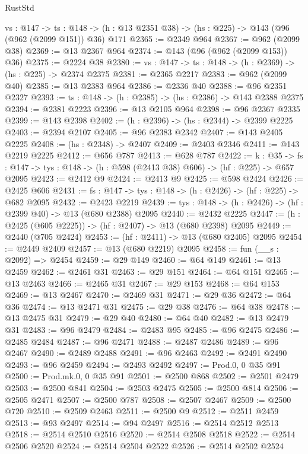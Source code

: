 \begin{lexlean}{RustStd}
\begin{coremodule}
{\begin{coremodule}
{{{{{  {vs : @147} ->
  {ts : @148} -> (h : @13 @2351 @38) -> (hs : @225) -> @143 (@96 (@962 (@2099 @151)) @36) @171
@2365 := @2349 @964
@2367 := @962 (@2099 @38)
@2369 := @13 @2367 @964
@2374 := @143 (@96 (@962 (@2099 @153)) @36)
@2375 := @2224 @38
@2380 := {vs : @147} -> {ts : @148} -> (h : @2369) -> (hs : @225) -> @2374 @2375
@2381 := @2365 @2217
@2383 := @962 (@2099 @40)
@2385 := @13 @2383 @964
@2386 := @2336 @40
@2388 := @96 @2351 @2327
@2393 := {ts : @148} -> (h : @2385) -> (hs : @2386) -> @143 @2388 @2375
@2394 := @2381 @2223
@2396 := @13 @2105 @964
@2398 := @96 @2367 @2335
@2399 := @143 @2398
@2402 := (h : @2396) -> (hs : @2344) -> @2399 @2225
@2403 := @2394 @2107
@2405 := @96 @2383 @2342
@2407 := @143 @2405 @2225
@2408 := (hs : @2348) -> @2407
@2409 := @2403 @2346
@2411 := @143 @2219 @2225
@2412 := @656 @787
@2413 := @628 @787
@2422 := {k : @35} ->
  {fs : @147} -> {tys : @148} -> (h : @598 (@2413 @38) @606) -> (hf : @225) -> @657 @2095
@2423 := @2412 @9
@2424 := @2413 @9
@2425 := @598 @2424
@2426 := @2425 @606
@2431 := {fs : @147} -> {tys : @148} -> (h : @2426) -> (hf : @225) -> @682 @2095
@2432 := @2423 @2219
@2439 := {tys : @148} -> (h : @2426) -> (hf : @2399 @40) -> @13 (@680 @2388) @2095
@2440 := @2432 @2225
@2447 := (h : @2425 (@605 @2225)) -> (hf : @2407) -> @13 (@680 @2398) @2095
@2449 := @2440 (@705 @2424)
@2453 := (hf : @2411) -> @13 (@680 @2405) @2095
@2454 := @2449 @2409
@2457 := @13 (@680 @2219) @2095
@2458 := fun (__s : @2092) => @2454
@2459 := @29 @149
@2460 := @64 @149
@2461 := @13 @2459
@2462 := @2461 @31
@2463 := @29 @151
@2464 := @64 @151
@2465 := @13 @2463
@2466 := @2465 @31
@2467 := @29 @153
@2468 := @64 @153
@2469 := @13 @2467
@2470 := @2469 @31
@2471 := @29 @36
@2472 := @64 @36
@2474 := @13 @2471 @31
@2475 := @29 @38
@2476 := @64 @38
@2478 := @13 @2475 @31
@2479 := @29 @40
@2480 := @64 @40
@2482 := @13 @2479 @31
@2483 := @96 @2479
@2484 := @2483 @95
@2485 := @96 @2475
@2486 := @2485 @2484
@2487 := @96 @2471
@2488 := @2487 @2486
@2489 := @96 @2467
@2490 := @2489 @2488
@2491 := @96 @2463
@2492 := @2491 @2490
@2493 := @96 @2459
@2494 := @2493 @2492
@2497 := Prod.{0, 0} @35 @91
@2500 := Prod.mk.{0, 0} @35 @91
@2501 := @2500 @868
@2502 := @2501 @2479
@2503 := @2500 @841
@2504 := @2503 @2475
@2505 := @2500 @814
@2506 := @2505 @2471
@2507 := @2500 @787
@2508 := @2507 @2467
@2509 := @2500 @720
@2510 := @2509 @2463
@2511 := @2500 @9
@2512 := @2511 @2459
@2513 := @93 @2497
@2514 := @94 @2497
@2516 := @2514 @2512 @2513
@2518 := @2514 @2510 @2516
@2520 := @2514 @2508 @2518
@2522 := @2514 @2506 @2520
@2524 := @2514 @2504 @2522
@2526 := @2514 @2502 @2524
}}}}}
\end{coremodule}}
\end{coremodule}
\end{lexlean}
